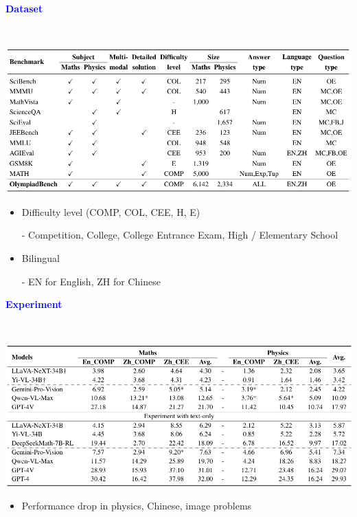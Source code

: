 \documentclass[professionalfont]{beamer}
\begin{document}
\begin{frame}
\begin{center}
    { \textbf{\textcolor{blue}{ {\fontsize{12}{14}\selectfont Dataset} }} }
\end{center}
\\[0.2cm]

\begin{center}
    \includegraphics[width=1.0\textwidth]{table1.png}
\end{center}

{\fontsize{9}{14}\selectfont 
\begin{itemize}
    \item Difficulty level (COMP, COL, CEE, H, E)
    
    - Competition, College, College Entrance Exam, High / Elementary School

    \item Bilingual
    
    - EN for English, ZH for Chinese
\end{itemize}
}

\end{frame}

\begin{frame}
\begin{center}
    { \textbf{\textcolor{blue}{ {\fontsize{12}{14}\selectfont Experiment} }} }
\end{center}
\\[0.2cm]

\begin{center}
    \includegraphics[width=1.0\textwidth]{table4.png}
\end{center}

{\fontsize{10}{14}\selectfont 
\begin{itemize}
    \item Performance drop in physics, Chinese, image problems
\end{itemize}
}

\end{frame}
\end{document}
